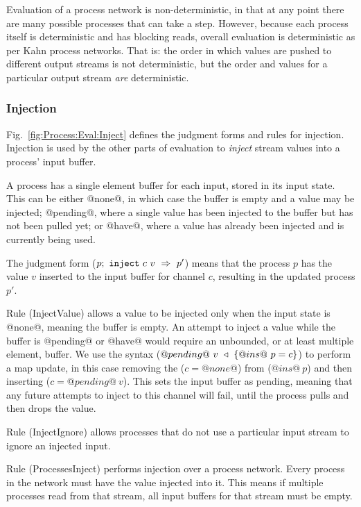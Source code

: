 Evaluation of a process network is non-deterministic, in that at any point there are many possible processes that can take a step.
However, because each process itself is deterministic and has blocking reads, overall evaluation is deterministic as per Kahn process networks.
That is: the order in which values are pushed to different output streams is not deterministic, but the order and values for a particular output stream \emph{are} deterministic.


\subsubsection{Injection}
Fig.~\ref{fig:Process:Eval:Inject} defines the judgment forms and rules for injection.
Injection is used by the other parts of evaluation to \emph{inject} stream values into a process' input buffer.

A process has a single element buffer for each input, stored in its input state.
This can be either @none@, in which case the buffer is empty and a value may be injected; @pending@, where a single value has been injected to the buffer but has not been pulled yet; or @have@, where a value has already been injected and is currently being used.

The judgment form ($\ProcInject{p}{c}{v}{p'}$) means that the process $p$ has the value $v$ inserted to the input buffer for channel $c$, resulting in the updated process $p'$.

Rule (InjectValue) allows a value to be injected only when the input state is @none@, meaning the buffer is empty.
An attempt to inject a value while the buffer is @pending@ or @have@ would require an unbounded, or at least multiple element, buffer.
We use the syntax ($\HeapUpdateOne{@ins@~p}{c}{@pending@~v}$) to perform a map update, in this case removing the ($c=@none@$) from ($@ins@~p$) and then inserting ($c=@pending@~v$).
This sets the input buffer as pending, meaning that any future attempts to inject to this channel will fail, until the process pulls and then drops the value.

Rule (InjectIgnore) allows processes that do not use a particular input stream to ignore an injected input.

Rule (ProcessesInject) performs injection over a process network.
Every process in the network must have the value injected into it.
This means if multiple processes read from that stream, all input buffers for that stream must be empty.

